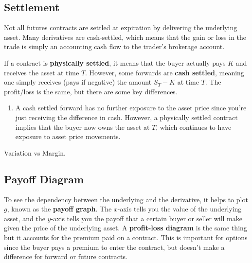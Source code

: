 \documentclass{article}
\begin{document}
  \subsection{Settlement}

    Not all futures contracts are settled at expiration by delivering the underlying asset. Many derivatives are cash-settled, which means that the gain or loss in the trade is simply an accounting cash flow to the trader's brokerage account. 

    \begin{definition}
      If a contract is \textbf{physically settled}, it means that the buyer actually pays $K$ and receives the asset at time $T$. However, some forwards are \textbf{cash settled}, meaning one simply receives (pays if negative) the amount $S_T - K$ at time $T$. The profit/loss is the same, but there are some key differences. 
      \begin{enumerate}
        \item A cash settled forward has no further exposure to the asset price since you're just receiving the difference in cash. However, a physically settled contract implies that the buyer now owns the asset at $T$, which continues to have exposure to asset price movements. 
      \end{enumerate}
    \end{definition}

    \begin{definition}
      
    \end{definition}

    Variation vs Margin. 

  \subsection{Payoff Diagram}

    \begin{definition}
      To see the dependency between the underlying and the derivative, it helps to plot $g$, known as the \textbf{payoff graph}. The $x$-axis tells you the value of the underlying asset, and the $y$-axis tells you the payoff that a certain buyer or seller will make given the price of the underlying asset. 
      A \textbf{profit-loss diagram} is the same thing but it accounts for the premium paid on a contract. This is important for options since the buyer pays a premium to enter the contract, but doesn't make a difference for forward or future contracts. 
    \end{definition}
\end{document}
